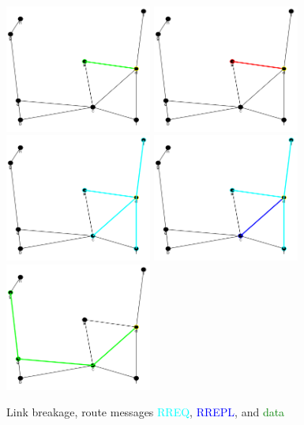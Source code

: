 \documentclass[conference]{IEEEtran}
\begin{document}
\begin{figure}
	\centering
	\includegraphics[width=1.9in]{Ex_3_data_1.png}
	\includegraphics[width=1.9in]{Ex_3_error.png}
	\includegraphics[width=1.9in]{Ex_3_request.png}
	\includegraphics[width=1.9in]{Ex_3_reply.png}
	\includegraphics[width=1.9in]{Ex_3_data_2.png}
	\caption{Link breakage, route messages \protect\textcolor{cyan}{RREQ}, \protect\textcolor{blue}{RREPL}, and \protect\textcolor{green}{data} }
	\label{fig:ex_3}
\end{figure}
\end{document}
